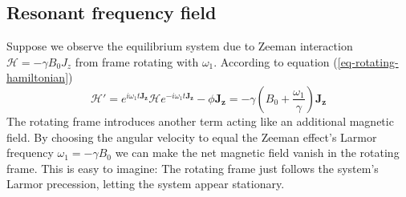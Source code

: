 \documentclass[11.5pt,a4paper]{article}
\begin{document}

\subsection{Resonant frequency field}
Suppose we observe the equilibrium system due to Zeeman interaction $\mathcal{H} = - \gamma B_0 J_z$ from frame rotating with $\omega_1$. According to equation (\ref{eq-rotating-hamiltonian})
\begin{equation}
  \mathcal{H'} = e^{i \omega_1 t \mathbf{J_z}} \mathcal{H} e^{-i \omega_1 t \mathbf{J_z}}- \phi \mathbf{J_z} = -\gamma(B_0 + \frac{\omega_1}{\gamma}) \mathbf{J_z}
\end{equation}
The rotating frame introduces another term acting like an additional magnetic field. By choosing the angular velocity to equal the Zeeman effect's Larmor frequency $\omega_1 = -\gamma B_0$ we can make the net magnetic field vanish in the rotating frame. This is easy to imagine: The rotating frame just follows the system's Larmor precession, letting the system appear stationary.
\end{document}
